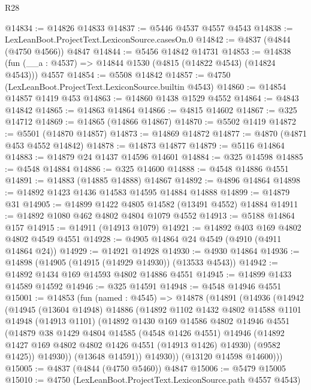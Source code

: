 \begin{lexlean}{R28}
\begin{coremodule}
@14834 := @14826 @14833
@14837 := @5446 @4537 @4557 @4543
@14838 := LexLeanBoot.ProjectText.LexiconSource.casesOn.{0}
@14842 := @4837 (@4844 (@4750 @4566)) @4847
@14844 := @5456 @14842 @14731
@14853 := @14838 (fun (__a : @4537) => @14844 @1530 (@4815 (@14822 @4543) (@14824 @4543))) @4557
@14854 := @5508 @14842
@14857 := @4750 (LexLeanBoot.ProjectText.LexiconSource.builtin @4543)
@14860 := @14854 @14857 @1419 @453
@14863 := @14860 @1438 @1529 @4552
@14864 := @4843 @14842
@14865 := @14863 @14864
@14866 := @4815 @14602
@14867 := @325 @14712
@14869 := @14865 (@14866 @14867)
@14870 := @5502 @1419
@14872 := @5501 (@14870 @14857)
@14873 := @14869 @14872
@14877 := @4870 (@4871 @453 @4552 @14842)
@14878 := @14873 @14877
@14879 := @5116 @14864
@14883 := @14879 @24 @1437 @14596 @14601
@14884 := @325 @14598
@14885 := @4548 @14884
@14886 := @325 @14600
@14888 := @4548 @14886 @4551
@14891 := @14883 (@14885 @14888) @14867
@14892 := @4896 @14864
@14898 := @14892 @1423 @1436 @14583 @14595 @14884 @14888
@14899 := @14879 @31
@14905 := @14899 @1422 @4805 @14582 (@13491 @4552) @14884
@14911 := @14892 @1080 @462 @4802 @4804 @1079 @4552
@14913 := @5188 @14864 @157
@14915 := @14911 (@14913 @1079)
@14921 := @14892 @403 @169 @4802 @4802 @4549 @4551
@14928 := @4905 @14864 @24 @4549 (@4910 (@4911 @14864 @24))
@14929 := @14921 @14928
@14930 := @4930 @14864
@14936 := @14898 (@14905 (@14915 (@14929 @14930)) (@13533 @4543))
@14942 := @14892 @1434 @169 @14593 @4802 @14886 @4551
@14945 := @14899 @1433 @14589 @14592
@14946 := @325 @14591
@14948 := @4548 @14946 @4551
@15001 := @14853
    (fun (named : @4545) =>
    @14878
      (@14891
        (@14936
          (@14942
            (@14945
              (@13604 @14948)
              @14886
              (@14892
                @1102
                @1432
                @4802
                @14588
                @1101
                @14948
                (@14913 @1101)
                (@14892
                  @1430
                  @169
                  @14586
                  @4802
                  @14946
                  @4551
                  (@14879
                    @38
                    @1429
                    @4804
                    @14585
                    (@4548 @1426 @4551)
                    @14946
                    (@14892 @1427 @169 @4802 @4802 @1426 @4551 (@14913 @1426) @14930)
                    (@9582 @1425))
                  @14930))
              (@13648 @14591))
            @14930))
        (@13120 @14598 @14600)))
@15005 := @4837 (@4844 (@4750 @5460)) @4847
@15006 := @5479 @15005
@15010 := @4750 (LexLeanBoot.ProjectText.LexiconSource.path @4557 @4543)

\end{coremodule}
\end{lexlean}
